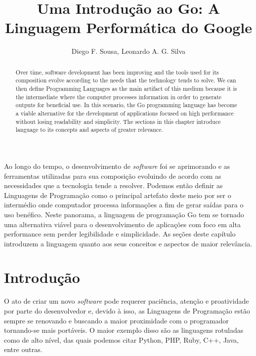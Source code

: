 \documentclass{SBCbookchapter}
\author{Diego F. Sousa, Leonardo A. G. Silva}
\title{Uma Introdução ao Go: A Linguagem Performática do Google}
\begin{document}
\maketitle

\begin{abstract}
Over time, software development has been improving and the tools used for its composition evolve according to the needs that the technology tends to solve. We can then define Programming Languages as the main artifact of this medium because it is the intermediate where the computer processes information in order to generate outputs for beneficial use. In this scenario, the Go programming language has become a viable alternative for the development of applications focused on high performance without losing readability and simplicity. The sections in this chapter introduce language to its concepts and aspects of greater relevance.
\end{abstract}

\begin{resumo}
\begin{otherlanguage}{brazilian}
Ao longo do tempo, o desenvolvimento de \textit{software} foi se aprimorando e as ferramentas utilizadas para sua composição evoluindo de acordo com as necessidades que a tecnologia tende a resolver. Podemos então definir as Linguagens de Programação como o principal artefato deste meio por ser o intermédio onde computador processa informações a fim de gerar saídas para o uso benéfico. Neste panorama, a linguagem de programação Go tem se tornado uma alternativa viável para o desenvolvimento de aplicações com foco em alta performance sem perder legibilidade e simplicidade. As seções deste capítulo introduzem a linguagem quanto aos seus conceitos e aspectos de maior relevância.
\end{otherlanguage}
\end{resumo}

\section{Introdução}


O ato de criar um novo \textit{software} pode requerer paciência, atenção e proatividade por parte do desenvolvedor e, devido à isso, as Linguagens de Programação estão sempre se renovando e buscando a maior proximidade com o programador tornando-se mais portáveis. O maior exemplo disso são as linguagens rotuladas como de alto nível, das quais podemos citar Python, PHP, Ruby, C++, Java, entre outras.
\end{document}

